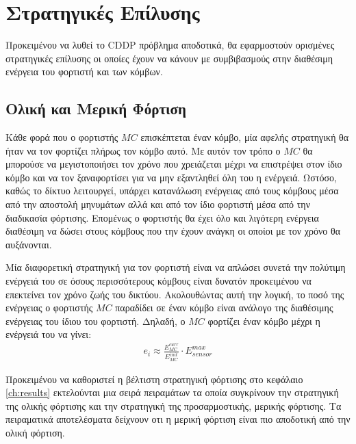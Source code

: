 \section{Στρατηγικές Επίλυσης}
Προκειμένου να λυθεί το CDDP πρόβλημα αποδοτικά, θα εφαρμοστούν ορισμένες στρατηγικές επίλυσης οι οποίες έχουν να κάνουν με συμβιβασμούς στην διαθέσιμη ενέργεια του
φορτιστή και των κόμβων.

\subsection{Ολική και Μερική Φόρτιση}
Κάθε φορά που ο φορτιστής $MC$ επισκέπτεται έναν κόμβο, μία αφελής στρατηγική θα ήταν να τον φορτίζει πλήρως τον κόμβο αυτό. Με αυτόν τον τρόπο ο $MC$ θα μπορούσε να
μεγιστοποιήσει τον χρόνο που χρειάζεται μέχρι να επιστρέψει στον ίδιο κόμβο και να τον ξαναφορτίσει για να μην εξαντληθεί όλη του η ενέργειά. Ωστόσο, καθώς το δίκτυο
λειτουργεί, υπάρχει κατανάλωση ενέργειας από τους κόμβους μέσα από την αποστολή μηνυμάτων αλλά και από τον ίδιο φορτιστή μέσα από την διαδικασία φόρτισης. Επομένως ο
φορτιστής θα έχει όλο και λιγότερη ενέργεια διαθέσιμη να δώσει στους κόμβους που την έχουν ανάγκη οι οποίοι με τον χρόνο θα αυξάνονται.

Μία διαφορετική στρατηγική για τον φορτιστή είναι να απλώσει συνετά την πολύτιμη ενέργειά του σε όσους περισσότερους κόμβους είναι δυνατόν προκειμένου να επεκτείνει
τον χρόνο ζωής του δικτύου. Ακολουθώντας αυτή την λογική, το ποσό της ενέργειας ο φορτιστής $MC$ παραδίδει σε έναν κόμβο είναι ανάλογο της διαθέσιμης ενέργειας του
ίδιου του φορτιστή. Δηλαδή, ο $MC$ φορτίζει έναν κόμβο μέχρι η ενέργειά του να γίνει:
\begin{align*}
e_{i} \approx \frac{E^{curr}_{MC}}{E^{init}_{MC}}\cdot E^{max}_{sensor}
\end{align*}

Προκειμένου να καθοριστεί η βέλτιστη στρατηγική φόρτισης στο κεφάλαιο \ref{ch:results} εκτελούνται μια σειρά πειραμάτων τα οποία συγκρίνουν την στρατηγική της ολικής
φόρτισης και την στρατηγική της προσαρμοστικής, μερικής φόρτισης. Τα πειραματικά αποτελέσματα δείχνουν οτι η μερική φόρτιση είναι πιο αποδοτική από την ολική φόρτιση.


